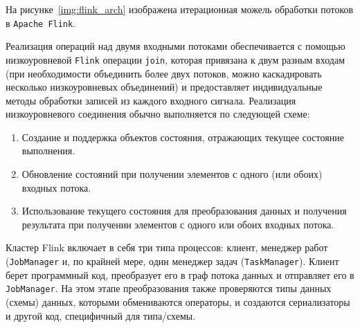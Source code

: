 На рисунке~\ref{img:flink_arch} изображена итерационная можель обработки потоков в \texttt{Apache Flink}.

Реализация операций над двумя входными потоками обеспечивается с помощью низкоуровневой \texttt{Flink} операции \texttt{join}, которая привязана к двум разным входам (при необходимости объединить более двух потоков, можно каскадировать несколько низкоуровневых объединений) и предоставляет индивидуальные методы обработки записей из каждого входного сигнала. 
Реализация низкоуровневого соединения обычно выполняется по следующей схеме:
\begin{enumerate}
  \item Создание и поддержка объектов состояния, отражающих текущее состояние выполнения.
  \item Обновление состояний при получении элементов с одного (или обоих) входных потока.
  \item Использование текущего состояния для преобразования данных и получения результата при получении элементов с одного или обоих входных потока.
\end{enumerate}

Кластер Flink включает в себя три типа процессов: клиент, менеджер работ (\texttt{JobManager} и, по крайней мере, один менеджер задач (\texttt{TaskManager}). Клиент берет программный код, преобразует его в граф потока данных и отправляет его в \texttt{JobManager}. На этом этапе преобразования также проверяются типы данных (схемы) данных, которыми обмениваются операторы, и создаются сериализаторы и другой код, специфичный для типа/схемы. 

